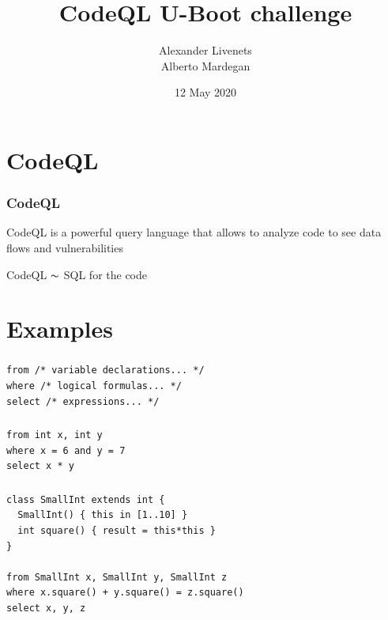 \documentclass[usenames,dvipsnames]{beamer}
\title{CodeQL U-Boot challenge}
\subtitle{}
\author{Alexander Livenets \\ Alberto Mardegan}
\institute{}
\date{12 May 2020}
\begin{document}


\begin{frame}
\titlepage
\end{frame}

\section{CodeQL}
\begin{frame}
\frametitle{CodeQL}
CodeQL is a powerful query language that allows to analyze code
to see data flows and vulnerabilities
\end{frame}

\begin{frame}
\centering
\huge CodeQL $\thicksim$ SQL for the code
\end{frame}

\section{Examples}
\begin{frame}[fragile]
\frametitle{\secname}
\small
\begin{verbatim}
from /* variable declarations... */
where /* logical formulas... */
select /* expressions... */
\end{verbatim}
\end{frame}

\begin{frame}[fragile]
\frametitle{\secname}
\small
\begin{verbatim}
from int x, int y
where x = 6 and y = 7
select x * y
\end{verbatim}
\end{frame}

\begin{frame}[fragile]
\frametitle{\secname}
\small
\begin{verbatim}
class SmallInt extends int {
  SmallInt() { this in [1..10] }
  int square() { result = this*this }
}

from SmallInt x, SmallInt y, SmallInt z
where x.square() + y.square() = z.square()
select x, y, z
\end{verbatim}
\end{frame}
\end{document}
